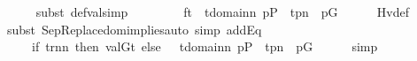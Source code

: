 \begin{isabellebody}
\ \ \ \ \isamarkupfalse%
\ {\isacharparenleft}{\kern0pt}subst\ def{\isacharunderscore}{\kern0pt}val{\isacharcomma}{\kern0pt}simp{\isacharparenright}{\kern0pt}\isanewline
\ \ \isamarkupfalse%
\isanewline
\ \ \isamarkupfalse%
\ {\isachardoublequoteopen}{\isachardot}{\kern0pt}{\isachardot}{\kern0pt}{\isachardot}{\kern0pt}\ {\isacharequal}{\kern0pt}\ {\isacharbraceleft}{\kern0pt}{\isacharquery}{\kern0pt}f{\isacharbackquote}{\kern0pt}t\ {\isachardot}{\kern0pt}{\isachardot}{\kern0pt}\ t{\isasymin}domain{\isacharparenleft}{\kern0pt}{\isacharquery}{\kern0pt}n{\isacharparenright}{\kern0pt}{\isacharcomma}{\kern0pt}\ {\isasymexists}p{\isasymin}P\ {\isachardot}{\kern0pt}\ {\isasymlangle}t{\isacharcomma}{\kern0pt}p{\isasymrangle}{\isasymin}{\isacharquery}{\kern0pt}n\ {\isasymand}\ p{\isasymin}G{\isacharbraceright}{\kern0pt}{\isachardoublequoteclose}\isanewline
\ \ \ \ \isamarkupfalse%
\ Hv{\isacharunderscore}{\kern0pt}def\isanewline
\ \ \ \ \isamarkupfalse%
\ {\isacharparenleft}{\kern0pt}subst\ SepReplace{\isacharunderscore}{\kern0pt}dom{\isacharunderscore}{\kern0pt}implies{\isacharcomma}{\kern0pt}auto\ simp\ add{\isacharcolon}{\kern0pt}Eq{}{\isacharparenright}{\kern0pt}\isanewline
\ \ \isamarkupfalse%
\isanewline
\ \ \isamarkupfalse%
\ \ {\isachardoublequoteopen}{\isachardot}{\kern0pt}{\isachardot}{\kern0pt}{\isachardot}{\kern0pt}\ {\isacharequal}{\kern0pt}\ {\isacharbraceleft}{\kern0pt}\ {\isacharparenleft}{\kern0pt}if\ t{\isasymin}{\isacharquery}{\kern0pt}r{\isacharparenleft}{\kern0pt}{\isacharquery}{\kern0pt}n{\isacharparenright}{\kern0pt}{\isacharminus}{\kern0pt}{\isacharbackquote}{\kern0pt}{\isacharbackquote}{\kern0pt}{\isacharbraceleft}{\kern0pt}{\isacharquery}{\kern0pt}n{\isacharbraceright}{\kern0pt}\ then\ val{\isacharparenleft}{\kern0pt}G{\isacharcomma}{\kern0pt}t{\isacharparenright}{\kern0pt}\ else\ {}{\isacharparenright}{\kern0pt}\ {\isachardot}{\kern0pt}{\isachardot}{\kern0pt}\ t{\isasymin}domain{\isacharparenleft}{\kern0pt}{\isacharquery}{\kern0pt}n{\isacharparenright}{\kern0pt}{\isacharcomma}{\kern0pt}\ {\isasymexists}p{\isasymin}P\ {\isachardot}{\kern0pt}\ {\isasymlangle}t{\isacharcomma}{\kern0pt}p{\isasymrangle}{\isasymin}{\isacharquery}{\kern0pt}n\ {\isasymand}\ p{\isasymin}G{\isacharbraceright}{\kern0pt}{\isachardoublequoteclose}\isanewline
\ \ \ \ \isamarkupfalse%
\ {\isacharparenleft}{\kern0pt}simp{\isacharparenright}{\kern0pt}\isanewline
\ \ \isamarkupfalse%
\isanewline
\ \ \isamarkupfalse%

\end{isabellebody}
